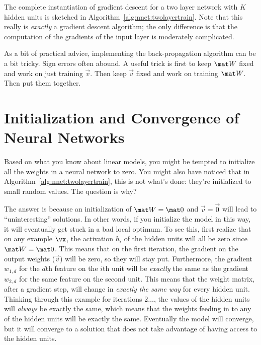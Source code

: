The complete instantiation of gradient descent for a two layer network
with $K$ hidden units is sketched in
Algorithm~\ref{alg:nnet:twolayertrain}.  Note that this really is
\emph{exactly} a gradient descent algorithm; the only difference is
that the computation of the gradients of the input layer is moderately
complicated.


As a bit of practical advice, implementing the back-propagation
algorithm can be a bit tricky.  Sign errors often abound.  A useful
trick is first to keep $\mat W$ fixed and work on just training $\vec
v$.  Then keep $\vec v$ fixed and work on training $\mat W$.  Then put
them together.


\section{Initialization and Convergence of Neural Networks}

Based on what you know about linear models, you might be tempted to
initialize all the weights in a neural network to zero.  You might
also have noticed that in Algorithm~\ref{alg:nnet:twolayertrain}, this
is not what's done: they're initialized to small random values.  The
question is why?

The answer is because an initialization of $\mat W = \mat 0$ and $\vec
v = \vec 0$ will lead to ``uninteresting'' solutions.  In other words,
if you initialize the model in this way, it will eventually get stuck
in a bad local optimum.  To see this, first realize that on any
example $\vx$, the activation $h_i$ of the hidden units will all be
zero since $\mat W = \mat 0$.  This means that on the first iteration,
the gradient on the output weights ($\vec v$) will be zero, so they
will stay put.  Furthermore, the gradient $w_{1,d}$ for the $d$th
feature on the $i$th unit will be \emph{exactly} the same as the
gradient $w_{2,d}$ for the same feature on the second unit.  This
means that the weight matrix, after a gradient step, will change in
\emph{exactly the same way} for every hidden unit.  Thinking through
this example for iterations $2\dots$, the values of the hidden units
will \emph{always} be exactly the same, which means that the weights
feeding in to any of the hidden units will be exactly the same.
Eventually the model will converge, but it will converge to a solution
that does not take advantage of having access to the hidden units.


